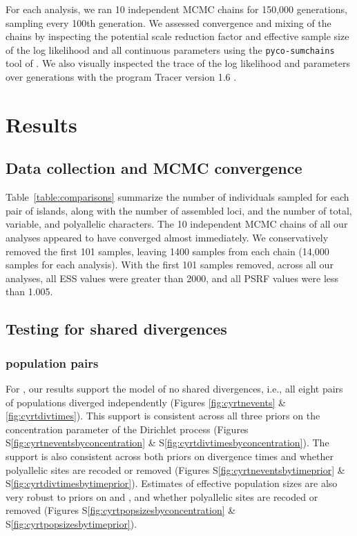 For each analysis, we ran 10 independent MCMC chains for 150,000 generations,
sampling every 100th generation.
We assessed convergence and mixing of the chains by inspecting the potential
scale reduction factor \citet[the square root of Equation 1.1 in][]{Brooks1998}
and effective sample size \citep{Gong2014} of the log likelihood and all
continuous parameters using the \texttt{pyco-sumchains} tool of \pycoevolity.
We also visually inspected the trace of the log likelihood and parameters over
generations with the program Tracer version 1.6 \citep{Tracer16}.


\section{Results}

\subsection{Data collection and MCMC convergence}
Table~\ref{table:comparisons} summarize the number of individuals sampled for
each pair of islands, along with the number of assembled loci, and the number
of total, variable, and polyallelic characters.
The 10 independent MCMC chains of all our \ecoevolity analyses appeared to have
converged almost immediately.
We conservatively removed the first 101 samples, leaving 1400 samples from each
chain (14,000 samples for each analysis).
With the first 101 samples removed, across all our analyses, all ESS values
were greater than 2000, and all PSRF values were less than 1.005.

\subsection{Testing for shared divergences}

\subsubsection{ population pairs}
For , our \ecoevolity results support the model of no shared
divergences, i.e., all eight pairs of populations diverged independently
(Figures \ref{fig:cyrtnevents} \& \ref{fig:cyrtdivtimes}).
This support is consistent across all three priors on the concentration
parameter of the Dirichlet process
(Figures
S\ref{fig:cyrtneventsbyconcentration}
\&
S\ref{fig:cyrtdivtimesbyconcentration}).
The support is also consistent across both priors on divergence times
and whether polyallelic sites are recoded or removed
(Figures
S\ref{fig:cyrtneventsbytimeprior}
\&
S\ref{fig:cyrtdivtimesbytimeprior}).
Estimates of effective population sizes are also very robust to
priors on \concentration and \divtime, and whether polyallelic sites
are recoded or removed
(Figures
S\ref{fig:cyrtpopsizesbyconcentration}
\&
S\ref{fig:cyrtpopsizesbytimeprior}).

